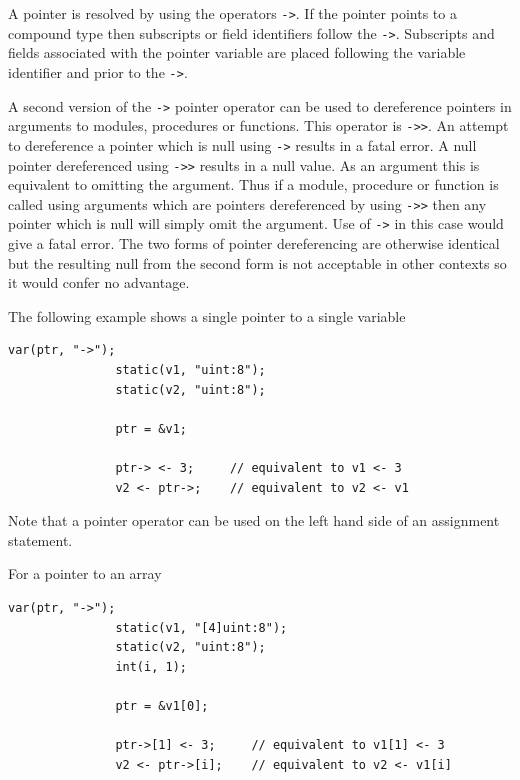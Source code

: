             A pointer is resolved by using the operators {\em \verb'->'}. If
            the pointer points to a compound type then subscripts or field
            identifiers follow the {\em \verb'->'}. Subscripts and fields
            associated with the pointer variable are placed following the
            variable identifier and prior to the {\em \verb'->'}.
            
            A second version of the {\em \verb'->'} pointer operator can be used
            to dereference pointers in arguments to modules, procedures or
            functions. This operator is {\em \verb'->>'}. An attempt to
            dereference a pointer which is null using {\em \verb'->'} results
            in a fatal error. A null pointer dereferenced using {\em \verb'->>'}
            results in a null value. As an argument this is equivalent to
            omitting the argument. Thus if a module, procedure or function is
            called using arguments which are pointers dereferenced by using
            {\em \verb'->>'} then any pointer which is null will simply
            omit the argument. Use of {\em \verb'->'} in this case would
            give a fatal error. The two forms of pointer dereferencing are
            otherwise identical but the resulting null from the second form
            is not acceptable in other contexts so it would confer no advantage.

            The following example shows a single pointer to a single variable
            \begin{lstlisting}[gobble=12, language=threepl]
               var(ptr, "->");
               static(v1, "uint:8");
               static(v2, "uint:8");

               ptr = &v1;

               ptr-> <- 3;     // equivalent to v1 <- 3
               v2 <- ptr->;    // equivalent to v2 <- v1
            \end{lstlisting}
            Note that a pointer operator can be used on the left hand side of
            an assignment statement.

            For a pointer to an array
            \begin{lstlisting}[gobble=12, language=threepl]
               var(ptr, "->");
               static(v1, "[4]uint:8");
               static(v2, "uint:8");
               int(i, 1);

               ptr = &v1[0];

               ptr->[1] <- 3;     // equivalent to v1[1] <- 3
               v2 <- ptr->[i];    // equivalent to v2 <- v1[i]
            \end{lstlisting}


